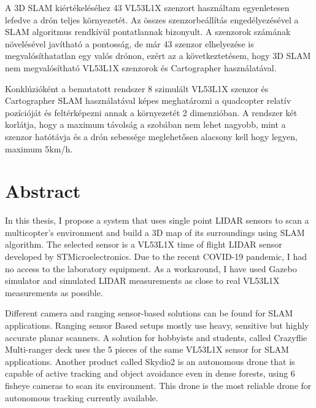 A 3D SLAM kiértékeléséhez 43 VL53L1X szenzort használtam egyenletesen lefedve a drón teljes környezetét.
Az összes szenzorbeállítás engedélyezésével a SLAM algoritmus rendkívül pontatlannak bizonyult. A szenzorok
számának növelésével javítható a pontosság, de már 43 szenzor elhelyezése is megvalósíthatatlan egy valós 
drónon, ezért az a következtetésem, hogy 3D SLAM nem megvalósítható VL53L1X szenzorok és Cartographer 
használatával.

Konklúzióként a bemutatott rendszer 8 szimulált VL53L1X szenzor és Cartographer SLAM használatával képes 
meghatározni a quadcopter relatív pozícióját és feltérképezni annak a környezetét 2 dimenzióban. 
A rendszer két korlátja, hogy a maximum távolság a szobában nem lehet nagyobb, mint a szenzor
hatótávja és a drón sebessége meglehetősen alacsony kell hogy legyen, maximum 5km/h.






\vfill
\selectenglish


\chapter*{Abstract}
In this thesis, I propose a system that uses single point LIDAR sensors to scan a multicopter's environment and 
build a 3D map of its surroundings using SLAM algorithm. The selected sensor is a VL53L1X time of flight LIDAR
sensor developed by STMicroelectronics. Due to the recent COVID-19 pandemic, I had no access to the laboratory 
equipment. As a workaround, I have used Gazebo simulator and simulated LIDAR measurements as close to
real VL53L1X measurements as possible. 

Different camera and ranging sensor-based solutions can be found for SLAM applications. Ranging sensor Based
setups mostly use heavy, sensitive but highly accurate planar scanners. A solution for hobbyists 
and students, called Crazyflie Multi-ranger deck uses the 5 pieces of the same VL53L1X sensor 
for SLAM applications. Another product called Skydio2 is an autonomous drone that is capable of active 
tracking and object avoidance even in dense forests, using 6 fisheye cameras to scan its environment. This 
drone is the most reliable drone for autonomous tracking currently available.

